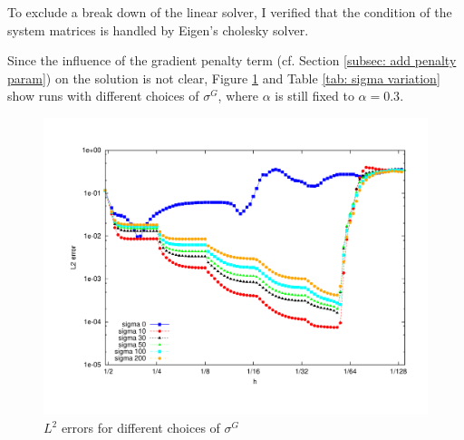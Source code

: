  To exclude a break down of the linear solver, I verified that the condition of the system matrices is handled by Eigen's cholesky solver.

Since the influence of the gradient penalty term (cf. Section \ref{subsec: add penalty param}) on the solution is not clear, Figure \ref{fig: sigma variation} and Table \ref{tab: sigma variation} show runs with different choices of $\sigma^G$, where $\alpha$ is still fixed to $\alpha=0.3$.
\begin{figure}[H]
	\centering
	\includegraphics[scale =0.4]{plots/MA1_deg2_sigma.pdf}
	\caption{$L^2$ errors for different choices of $\sigma^G$}
	\label{fig: sigma variation}
\end{figure}


